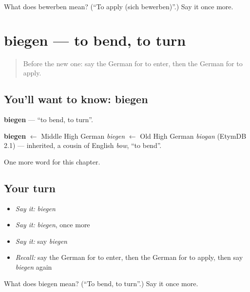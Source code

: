 \begin{tcolorbox}[breakable,colback=teal!4,colframe=teal!35!black,title={Before you move on}]
What does bewerben mean? (\textquotedblleft{}To apply (sich bewerben)\textquotedblright{}.) Say it once more.
\end{tcolorbox}
\section[biegen]{biegen — to bend, to turn}

\label{lesson:GE-C177-biegen}



\begin{quote}
Before the new one: say the German for to enter, then the German for to apply.
\end{quote}

\subsection*{You'll want to know: biegen}
\textbf{biegen} — \textquotedblleft{}to bend, to turn\textquotedblright{}.

\begin{cousinweb}
\textbf{biegen} $\leftarrow$ Middle High German \emph{biegen} $\leftarrow$ Old High German \emph{biogan} (EtymDB 2.1) — inherited, a cousin of English \emph{bow}, \textquotedblleft{}to bend\textquotedblright{}.
\end{cousinweb}

\begin{grammarlens}[title={What you've built}]
One more word for this chapter.
\end{grammarlens}

\subsection*{Your turn}
\begin{itemize}
\raggedright
  \item \emph{Say it:} \emph{biegen}
  \item \emph{Say it:} \emph{biegen}, once more
  \item \emph{Say it:} say \emph{biegen}
  \item \emph{Recall:} say the German for to enter, then the German for to apply, then say \emph{biegen} again
\end{itemize}

\begin{tcolorbox}[breakable,colback=teal!4,colframe=teal!35!black,title={Before you move on}]
What does biegen mean? (\textquotedblleft{}To bend, to turn\textquotedblright{}.) Say it once more.
\end{tcolorbox}
